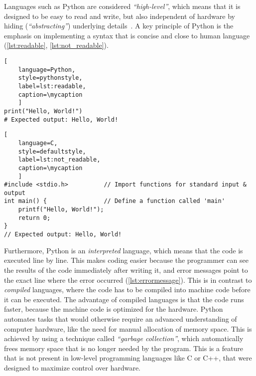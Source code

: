 Languages such as Python are considered \textit{``high-level''}, which means
that it is designed to be easy to read and write, but also independent of
hardware by hiding (\textit{``abstracting''}) underlying
details~\cite{PythonLanguageReference2024}. A key principle of Python is the
emphasis on implementing a syntax that is concise and close to human language
(\autoref{lst:readable}, \autoref{lst:not_readable}).

\def\mycaption{ Example of
    readable Python code. This one-line code returns the words (string)
    \texttt{"Hello, World!"} when executed. The command is straightforward and easy
    to understand.}
\begin{lstlisting}[
    language=Python, 
    style=pythonstyle,
    label=lst:readable,
    caption=\mycaption
    ]
print("Hello, World!")
# Expected output: Hello, World!
\end{lstlisting}

\def\mycaption{ Example of less readable code written in the low-level
    programming language C. This code is doing exactly the same as the Python
    code in \autoref{lst:readable}, but is harder to understand because more
    steps are needed, including the import of a library \texttt{stdio.h} and the
    definition of a function called \texttt{main}. Note that C uses \texttt{//}
    to begin comment sections.}
\begin{lstlisting}[
    language=C, 
    style=defaultstyle,
    label=lst:not_readable, 
    caption=\mycaption
    ]
#include <stdio.h>          // Import functions for standard input & output
int main() {                // Define a function called 'main'
    printf("Hello, World!");
    return 0;
}
// Expected output: Hello, World!
\end{lstlisting}

Furthermore, Python is an \textit{interpreted} language, which means that the
code is executed line by line. This makes coding easier because the programmer
can see the results of the code immediately after writing it, and error messages
point to the exact line where the error occurred (\autoref{lst:errormessage}).
This is in contrast to \textit{compiled} languages, where the code has to be
compiled into machine code before it can be executed. The advantage of compiled
languages is that the code runs faster, because the machine code is optimized
for the hardware.
Python automates tasks that would otherwise require an advanced understanding of
computer hardware, like the need for manual allocation of memory space. This is
achieved by using a technique called \textit{``garbage collection''}, which
automatically frees memory space that is no longer needed by the program. This
is a feature that is not present in low-level programming languages like C or
C++, that were designed to maximize control over hardware.

